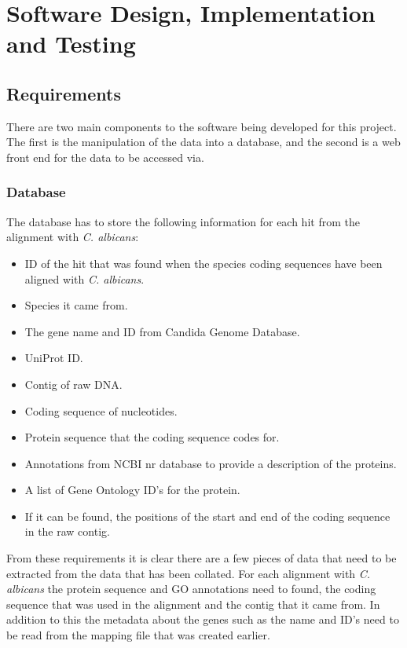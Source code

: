 \chapter{Software Design, Implementation and Testing}

% 

\section{Requirements}
There are two main components to the software being developed for this project. The first is the manipulation of the data into a database, and the second is a web front end for the data to be accessed via. 

\subsection{Database}
The database has to store the following information for each hit from the alignment with \textit{C. albicans}:

\begin{itemize}
  \item ID of the hit that was found when the species coding sequences have been aligned with \textit{C. albicans}.
  \item Species it came from.
  \item The gene name and ID from Candida Genome Database.
  \item UniProt ID.
  \item Contig of raw DNA.
  \item Coding sequence of nucleotides.
  \item Protein sequence that the coding sequence codes for.
  \item Annotations from NCBI nr database to provide a description of the proteins.
  \item A list of Gene Ontology\cite{geneontology} ID's for the protein.
  \item If it can be found, the positions of the start and end of the coding sequence in the raw contig. 
\end{itemize}

From these requirements it is clear there are a few pieces of data that need to be extracted from the data that has been collated. For each alignment with \textit{C. albicans} the protein sequence and GO annotations need to found, the coding sequence that was used in the alignment and the contig that it came from. In addition to this the metadata about the genes such as the name and ID's need to be read from the mapping file that was created earlier. 

